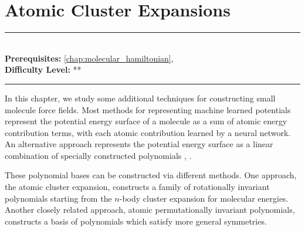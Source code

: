 \documentclass[book.tex]{subfiles}
\begin{document}
\chapter{Atomic Cluster Expansions}
\label{chap:pips}
\noindent\rule{11cm}{0.4pt} \\
\textbf{Prerequisites:}  \autoref{chap:molecular_hamiltonian},   \\
\textbf{Difficulty Level:} ** \\
\noindent\rule{11cm}{0.4pt}
\vspace{5mm}



In this chapter, we study some additional techniques for constructing small molecule force fields. Most methods for representing machine learned potentials represent the potential energy surface of a molecule as a sum of atomic energy contribution terms, with each atomic contribution learned by a neural network. An alternative approach represents the potential energy surface as a linear combination of specially constructed polynomials \cite{allen2021atomic}, \cite{kovacs2021linear}.

These polynomial bases can be constructed via different methods. One approach, the atomic cluster expansion, constructs a family of rotationally invariant polynomials starting from the $n$-body cluster expansion for molecular energies. Another closely related approach, atomic permutationally invariant polynomials, constructs a basis of polynomials which satisfy more general symmetries.
\end{document}
